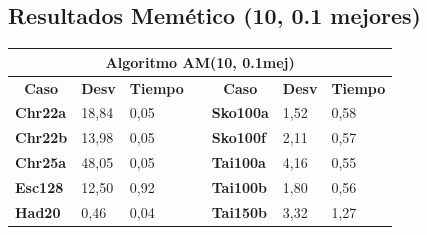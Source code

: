 \documentclass[a4paper, 12pt]{article}
\begin{document}
      
      
      \newpage
      \subsection{Resultados Memético (10, 0.1 mejores)}
      \begin{table}[H]
\centering
\label{my-label}
\begin{tabular}{|l|l|l|l|l|l|l|}
\hline
\multicolumn{7}{|c|}{\textbf{Algoritmo AM(10, 0.1mej)}}                                                                                                                                                                                                     \\ \hline
\multicolumn{1}{|c|}{\textbf{Caso}} & \multicolumn{1}{c|}{\textbf{Desv}} & \multicolumn{1}{c|}{\textbf{Tiempo}} & \multicolumn{1}{c|}{} & \multicolumn{1}{c|}{\textbf{Caso}} & \multicolumn{1}{c|}{\textbf{Desv}} & \multicolumn{1}{c|}{\textbf{Tiempo}} \\ \cline{1-3} \cline{5-7} 
\textbf{Chr22a}                     & 18,84                              & 0,05                                 &                       & \textbf{Sko100a}                   & 1,52                               & 0,58                                 \\ \cline{1-3} \cline{5-7} 
\textbf{Chr22b}                     & 13,98                              & 0,05                                 &                       & \textbf{Sko100f}                   & 2,11                               & 0,57                                 \\ \cline{1-3} \cline{5-7} 
\textbf{Chr25a}                     & 48,05                              & 0,05                                 &                       & \textbf{Tai100a}                   & 4,16                               & 0,55                                 \\ \cline{1-3} \cline{5-7} 
\textbf{Esc128}                     & 12,50                              & 0,92                                 &                       & \textbf{Tai100b}                   & 1,80                               & 0,56                                 \\ \cline{1-3} \cline{5-7} 
\textbf{Had20}                      & 0,46                               & 0,04                                 &                       & \textbf{Tai150b}                   & 3,32                               & 1,27                                 \\ \cline{1-3} \cline{5-7} 

\end{tabular}
\end{table}
\end{document}
